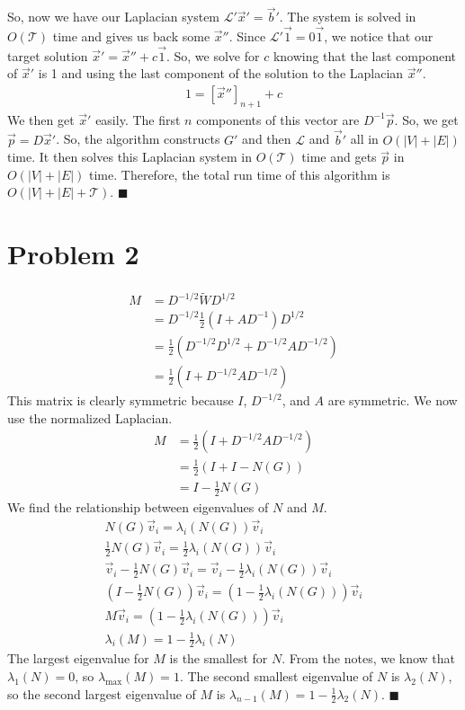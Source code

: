 \documentclass[12pt,a4paper]{article}
\begin{document}
	So, now we have our Laplacian system $\mathcal{L}' \vec{x}' = \vec{b}'$. The system is solved in $O(\mathcal{T})$ time and gives us back some $\vec{x}''$. Since $\mathcal{L}' \vec{1} = 0 \vec{1}$, we notice that our target solution $\vec{x}' = \vec{x}'' + c\vec{1}$. So, we solve for $c$ knowing that the last component of $\vec{x}'$ is 1 and using the last component of the solution to the Laplacian $\vec{x}''$.
	\begin{gather*}
		1 = [\vec{x}'']_{n+1} + c
	\end{gather*}
	We then get $\vec{x}'$ easily. The first $n$ components of this vector are $D^{-1}\vec{p}$. So, we get $\vec{p} = D \vec{x}'$. So, the algorithm constructs $G'$ and then $\mathcal{L}$ and $\vec{b}'$ all in $O(|V| + |E|)$ time. It then solves this Laplacian system in $O(\mathcal{T})$ time and gets $\vec{p}$ in $O(|V| + |E|)$ time. Therefore, the total run time of this algorithm is $O(|V| + |E| + \mathcal{T})$.
	$\blacksquare$
	
	\section*{Problem 2}
	\begin{align*}
		M 
		&= D^{-1/2} \tilde{W} D^{1/2}\\
		&= D^{-1/2} \frac{1}{2} (I + A D^{-1}) D^{1/2}\\
		&= \frac{1}{2} (D^{-1/2} D^{1/2} + D^{-1/2} A D^{-1/2})\\
		&= \frac{1}{2} (I + D^{-1/2} A D^{-1/2})
	\end{align*}
	This matrix is clearly symmetric because $I$, $D^{-1/2}$, and $A$ are symmetric. We now use the normalized Laplacian.
	\begin{align*}
		M
		&= \frac{1}{2} (I + D^{-1/2} A D^{-1/2})\\
		&= \frac{1}{2} (I + I - N(G))\\
		&= I - \frac{1}{2} N(G)
	\end{align*}
	We find the relationship between eigenvalues of $N$ and $M$.
	\begin{gather*}
		N(G) \vec{v}_i = \lambda_i(N(G)) \vec{v}_i\\
		\frac{1}{2} N(G) \vec{v}_i = \frac{1}{2} \lambda_i(N(G)) \vec{v}_i\\
		\vec{v}_i - \frac{1}{2} N(G) \vec{v}_i = \vec{v}_i - \frac{1}{2} \lambda_i(N(G)) \vec{v}_i\\
		\left( I - \frac{1}{2} N(G) \right) \vec{v}_i = \left(1 - \frac{1}{2} \lambda_i(N(G)) \right) \vec{v}_i\\
		M \vec{v}_i = \left(1 - \frac{1}{2} \lambda_i(N(G)) \right) \vec{v}_i\\
		\lambda_i(M) = 1 - \frac{1}{2} \lambda_i(N)
	\end{gather*}
	The largest eigenvalue for $M$ is the smallest for $N$. From the notes, we know that $\lambda_1(N) = 0$, so $\lambda_{\max}(M) = 1$. The second smallest eigenvalue of $N$ is $\lambda_2(N)$, so the second largest eigenvalue of $M$ is $\lambda_{n-1}(M) = 1 - \frac{1}{2} \lambda_2(N)$.
	$\blacksquare$
	
\end{document}
